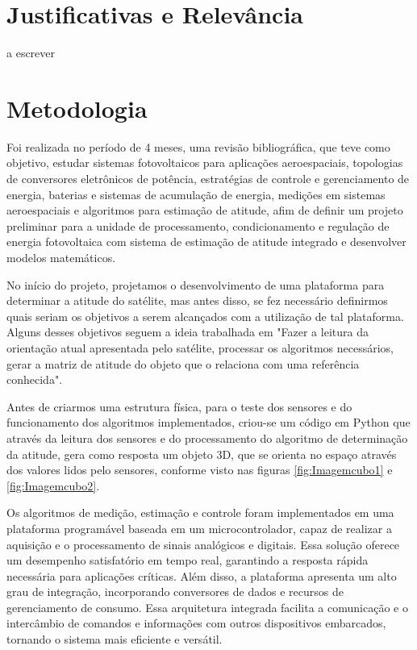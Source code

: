 \documentclass[
	12pt,				%
	openright,			%
	oneside,			%
	a4paper,			%
	english,			%
	brazil				%
	]{abntex2}
\begin{document}
  

\section{Justificativas e Relevância}

a escrever

\section{Metodologia}
Foi realizada no período de 4 meses, uma revisão bibliográfica, que teve como objetivo, estudar sistemas fotovoltaicos para aplicações aeroespaciais, topologias de conversores eletrônicos de potência, estratégias de controle e gerenciamento de energia, baterias e sistemas de acumulação de energia, medições em sistemas aeroespaciais e algoritmos para estimação de atitude, afim de definir um projeto preliminar para a unidade de processamento, condicionamento e regulação de energia fotovoltaica com sistema de estimação de atitude integrado e desenvolver modelos matemáticos. 

No início do projeto, projetamos o desenvolvimento de uma plataforma para determinar a atitude do satélite, mas antes disso, se fez necessário definirmos quais seriam os objetivos a serem alcançados com a utilização de tal plataforma. Alguns desses objetivos seguem a ideia trabalhada em \cite{tavares2017}"Fazer a leitura da orientação atual apresentada pelo satélite, processar os algoritmos necessários, gerar a matriz de atitude do objeto que o relaciona com uma referência conhecida".

Antes de criarmos uma estrutura física, para o teste dos sensores e do funcionamento dos algoritmos implementados, criou-se um código em Python que através da leitura dos sensores e do processamento do algoritmo de determinação da atitude, gera como resposta um objeto 3D, que se orienta no espaço através dos valores lidos pelo sensores, conforme visto nas figuras \ref{fig:Imagemcubo1} e \ref{fig:Imagemcubo2}.

Os algoritmos de medição, estimação e controle foram implementados em uma plataforma programável baseada em um microcontrolador, capaz de realizar a aquisição e o processamento de sinais analógicos e digitais. Essa solução oferece um desempenho satisfatório em tempo real, garantindo a resposta rápida necessária para aplicações críticas. Além disso, a plataforma apresenta um alto grau de integração, incorporando conversores de dados e recursos de gerenciamento de consumo. Essa arquitetura integrada facilita a comunicação e o intercâmbio de comandos e informações com outros dispositivos embarcados, tornando o sistema mais eficiente e versátil.
\end{document}

